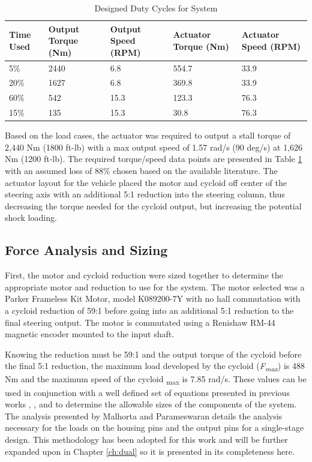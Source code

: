 \begin{table}[h]
  \vskip0.2cm
  \caption{Designed Duty Cycles for System}
  \label{table:duty_cycle}
  \begin{center}
    \vskip-0.2cm
    \begin{tabular}{|p{}||p{}||p{}| |p{}| |p{}|}
    \hline
    Time Used & Output Torque (Nm) & Output Speed (RPM) & Actuator Torque (Nm) & Actuator Speed (RPM)\\
    \hline
    5\% & 2440 & 6.8 & 554.7 & 33.9\\
    \hline
    20\% & 1627 & 6.8 & 369.8 & 33.9\\
    \hline
    60\% & 542 & 15.3 & 123.3 & 76.3\\
    \hline
    15\% & 135 & 15.3 & 30.8 & 76.3\\
    \hline
    \end{tabular}
  \end{center}
\end{table}

Based on the load cases, the actuator was required to output a stall torque of 2,440 Nm (1800 ft-lb) with a max output speed of 1.57 rad/s (90 deg/s) at 1,626 Nm (1200 ft-lb).
The required torque/speed data points are presented in Table \ref{table:duty_cycle} with an assumed loss of 88\% chosen based on the available literature.
The actuator layout for the vehicle placed the motor and cycloid off center of the steering axis with an additional 5:1 reduction into the steering column, thus decreasing the torque needed for the cycloid output, but increasing the potential shock loading.

\subsection{Force Analysis and Sizing} \label{ch:design:single:force_analysis}

First, the motor and cycloid reduction were sized together to determine the appropriate motor and reduction to use for the system. The motor selected was a Parker Frameless Kit Motor, model K089200-7Y with no hall commutation with a cycloid reduction of 59:1 before going into an additional 5:1 reduction to the final steering output. The motor is commutated using a Renishaw RM-44 magnetic encoder mounted to the input shaft. 

Knowing the reduction must be 59:1 and the output torque of the cycloid before the final 5:1 reduction, the maximum load developed by the cycloid (\textit{F\textsubscript{max}}) is 488 Nm and the maximum speed of the cycloid {\textomega\textsubscript{max}} is 7.85 rad/s. These values can be used in conjunction with a well defined set of equations presented in previous works \cite{ref:malhorta_2}, \cite{ref:li}, and \cite{ref:unified_approach} to determine the allowable sizes of the components of the system. The analysis presented by Malhorta and Parameswaran details the analysis necessary for the loads on the housing pins and the output pins for a single-stage design. This methodology has been adopted for this work and will be further expanded upon in Chapter \ref{ch:dual} so it is presented in its completeness here. 


